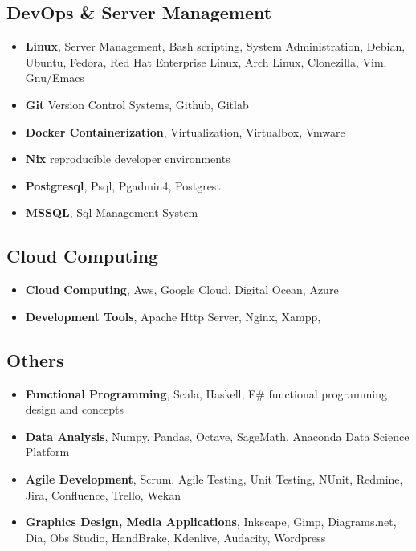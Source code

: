 \documentclass[line,margin]{res}
\begin{document}
\begin{resume}
                 \subsection{DevOps \& Server Management}
                 \begin{itemize}  \itemsep -2pt %
                   \item \textbf{Linux}, Server Management, Bash scripting, System Administration, Debian, Ubuntu, Fedora, Red Hat Enterprise Linux, Arch Linux, Clonezilla, Vim, Gnu/Emacs
                   \item \textbf{Git} Version Control Systems, Github, Gitlab
                   \item \textbf{Docker Containerization}, Virtualization, Virtualbox, Vmware
                   \item \textbf{Nix} reproducible developer environments
                   \item \textbf{Postgresql}, Psql, Pgadmin4, Postgrest 
                   \item \textbf{MSSQL}, Sql Management System 
                 \end{itemize}
                 \subsection{Cloud Computing}
                 \begin{itemize}  \itemsep -2pt %
                   \item \textbf{Cloud Computing}, Aws, Google Cloud, Digital Ocean, Azure
                   \item \textbf{Development Tools}, Apache Http Server, Nginx, Xampp, 
                 \end{itemize}
                 \subsection{Others}
                 \begin{itemize}  \itemsep -2pt %
                   \item \textbf{Functional Programming}, Scala, Haskell, F\# functional programming design and concepts 
                   \item \textbf{Data Analysis}, Numpy, Pandas, Octave, SageMath, Anaconda Data Science Platform 
                   \item \textbf{Agile Development},  Scrum, Agile Testing, Unit Testing, NUnit, Redmine, Jira, Confluence, Trello, Wekan
                   \item \textbf{Graphics Design, Media Applications}, Inkscape, Gimp, Diagrams.net, Dia, Obs Studio, HandBrake, Kdenlive, Audacity, Wordpress
                 \end{itemize}
 

\end{resume}
\end{document}
